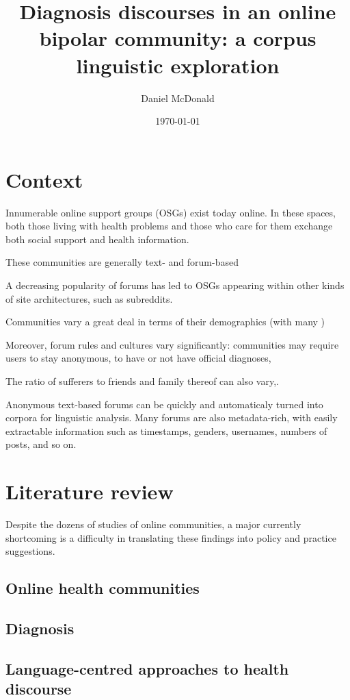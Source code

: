 \documentclass{article}
\author{Daniel McDonald}
\date{\today}
\title{Diagnosis discourses in an online bipolar community: a corpus linguistic exploration}
\begin{document}
\maketitle

\section{Context}

Innumerable online support groups (OSGs) exist today online. In these spaces, both those living with health problems and those who care for them exchange both social support and health information.

These communities are generally text- and forum-based

A decreasing popularity of forums has led to OSGs appearing within other kinds of site architectures, such as subreddits.

Communities vary a great deal in terms of their demographics (with many )

Moreover, forum rules and cultures vary significantly: communities may require users to stay anonymous, to have or not have official diagnoses, 

The ratio of sufferers to friends and family thereof can also vary,.

Anonymous text-based forums can be quickly and automaticaly turned into corpora for linguistic analysis. Many forums are also metadata-rich, with easily extractable information such as timestamps, genders, usernames, numbers of posts, and so on.

\section{Literature review}



Despite the dozens of studies of online communities, a major currently shortcoming is a difficulty in translating these findings into policy and practice suggestions.

\subsection{Online health communities}

\subsection{Diagnosis}

\subsection{Language-centred approaches to health discourse}
\end{document}
